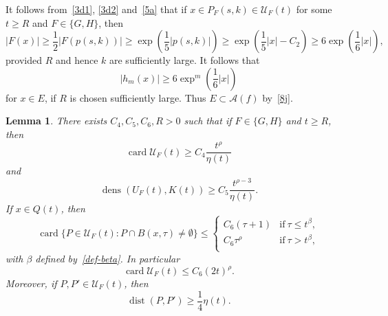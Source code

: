 \documentclass[12pt,a4paper]{amsart}
\theoremstyle{plain}
\newtheorem{lemma}[theorem]{Lemma}
\theoremstyle{definition}
\theoremstyle{remark}
\def\cA{\mathcal A}
\def\cU{\mathcal U}
\def\dens{\operatorname{dens}}
\def\dist{\operatorname{dist}}
\def\card{\operatorname{card}}
\numberwithin{equation}{section}
\begin{document}
It follows from~\eqref{3d1}, \eqref{3d2} and~\eqref{5a} that if
$x\in P_F(s,k)\in \cU_F(t)$ for some $t\geq R$ and $F\in\{G,H\}$,
then 
\begin{equation}\label{5d1}
|F(x)|\geq \frac12 |F(p(s,k))|
\geq \exp\!\left(\frac15 |p(s,k)|\right)
\geq \exp\!\left(\frac15 |x|-C_2\right)
\geq 6 \exp\!\left(\frac16 |x|\right),
\end{equation}
provided $R$ and hence $k$ are sufficiently large.
It follows that 
\begin{equation}\label{5d2}
|h_m(x)|\geq 6\exp^m\!\left(\frac{1}{6}|x|\right)
\end{equation}
for $x\in E$, if $R$ is chosen sufficiently large.
Thus $E\subset\cA(f)$ by~\eqref{8j}.
\begin{lemma} \label{lemma3}
There exists $C_4,C_5,C_6,R>0$ such that if $F\in\{G,H\}$ and $t\geq R$, then
\begin{equation}\label{3h1}
\card \cU_F(t)
\geq C_4 \frac{t^{\rho}}{\eta(t)}
\end{equation}
and
\begin{equation}\label{3h2}
\dens\!\left(U_F(t),K(t)\right)
\geq C_5 \frac{t^{\rho-3}}{\eta(t)}.
\end{equation}
If  $x\in Q(t)$, then
\begin{equation}\label{3h3}
\card\{P\in  \cU_F(t)\colon P\cap B(x,\tau)\neq\emptyset\}
\leq
\begin{cases}
C_6(\tau +1) &\text{if}\ \tau\leq t^{\beta},\\
C_6\tau^\rho    &\text{if}\ \tau> t^{\beta},\\
\end{cases}
\end{equation}
with $\beta$ defined by~\eqref{def-beta}.
In particular 
\begin{equation}\label{eq3h3}
	\card \cU_F(t)\leq C_6(2t)^\rho.
\end{equation}
Moreover, if $P,P'\in \cU_F(t)$, then
\begin{equation}\label{3h4}
\dist(P,P')\geq\frac14 \eta(t).
\end{equation}
\end{lemma}
\end{document}
